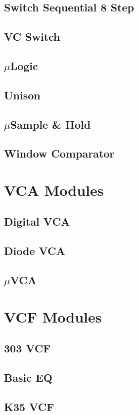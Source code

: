 \documentclass[11pt]{book}
\begin{document}
\section{Switch Sequential 8 Step}
\pagebreak
\section{VC Switch}
\pagebreak
\section{$\mu$Logic}
\pagebreak
\section{Unison}
\pagebreak
\section{$\mu$Sample \& Hold}
\pagebreak
\section{Window Comparator}
\pagebreak

\chapter{VCA Modules}
\pagebreak
\section{Digital VCA}
\pagebreak
\section{Diode VCA}
\pagebreak
\section{$\mu$VCA}
\pagebreak

\chapter{VCF Modules}
\pagebreak
\section{303 VCF}
\pagebreak
\section{Basic EQ}
\pagebreak
\section{K35 VCF}
\pagebreak
\end{document}
